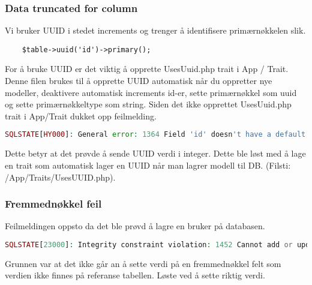 \subsubsection{Data truncated for column}
Vi bruker UUID i stedet increments og trenger å identifisere primærnøkkelen slik.
\begin{lstlisting}
    $table->uuid('id')->primary();
\end{lstlisting}

For å bruke UUID er det viktig å opprette UsesUuid.php trait i App / Trait.
Denne filen brukes til å opprette UUID automatisk når du oppretter nye modeller, deaktivere automatisk increments id-er, sette primærnøkkel som uuid og sette primærnøkkeltype som string.\cite{medium2019aut} Siden det ikke opprettet UsesUuid.php trait i App/Trait dukket opp feilmelding. 

\begin{lstlisting}[language=PHP]
SQLSTATE[HY000]: General error: 1364 Field 'id' doesn't have a default value (SQL: insert into `fields` (`name`, `slug`, `updated_at`, `created_at`) values (HELLO WORLD, hello_world, 2019-02-06 08:57:48, 2019-02-06 08:57:48))
\end{lstlisting}
Dette betyr at det prøvde å sende UUID verdi i integer.
Dette ble løst med å lage en trait som automatisk lager en UUID når man lagrer modell til DB. (Filsti: /App/Traits/UsesUUID.php).\cite{powery2018euil}
 
\subsubsection{Fremmednøkkel feil}
Feilmeldingen oppsto da det ble prøvd å lagre en bruker på databasen. 

\begin{lstlisting}[language=PHP]
    SQLSTATE[23000]: Integrity constraint violation: 1452 Cannot add or update a child row: a foreign key constraint fails (`sirkus-media`.`users`, CONSTRAINT `users_image_id_foreign` FOREIGN KEY (`image_id`) REFERENCES `images` (`id`)) (SQL: insert into `users` (`name`, `phone`, `email`, `password`, `image_id`, `verified`, `email_token`, `id`, `updated_at`, `created_at`) values (Bere, 4578891, berg@gmail.com, 1234567r, 2432479, 1, e-token, 53f98032-f9bf-40a6-9d70-ca9c0785d7ee, 2019-02-08 10:11:16, 2019-02-08 10:11:16))
\end{lstlisting}

Grunnen var at det ikke går an å sette verdi på en fremmednøkkel felt som verdien ikke finnes på referanse tabellen. Løste ved å sette riktig verdi.

